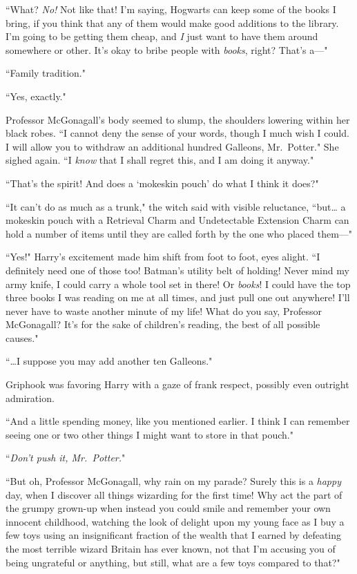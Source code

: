 ``What? \emph{No!} Not like that! I'm saying, Hogwarts can keep some of the books I bring, if you think that any of them would make good additions to the library. I'm going to be getting them cheap, and \emph{I} just want to have them around somewhere or other. It's okay to bribe people with \emph{books}, right? That's a—"

``Family tradition."

``Yes, exactly."

Professor McGonagall's body seemed to slump, the shoulders lowering within her black robes. ``I cannot deny the sense of your words, though I much wish I could. I will allow you to withdraw an additional hundred Galleons, Mr.~Potter." She sighed again. ``I \emph{know} that I shall regret this, and I am doing it anyway."

``That's the spirit! And does a `mokeskin pouch' do what I think it does?"

``It can't do as much as a trunk," the witch said with visible reluctance, ``but{\ldots} a mokeskin pouch with a Retrieval Charm and Undetectable Extension Charm can hold a number of items until they are called forth by the one who placed them---"

``Yes!" Harry's excitement made him shift from foot to foot, eyes alight. ``I definitely need one of those too! Batman's utility belt of holding! Never mind my army knife, I could carry a whole tool set in there! Or \emph{books}! I could have the top three books I was reading on me at all times, and just pull one out anywhere! I'll never have to waste another minute of my life! What do you say, Professor McGonagall? It's for the sake of children's reading, the best of all possible causes."

``{\ldots}I suppose you may add another ten Galleons."

Griphook was favoring Harry with a gaze of frank respect, possibly even outright admiration.

``And a little spending money, like you mentioned earlier. I think I can remember seeing one or two other things I might want to store in that pouch."

``\emph{Don't push it, Mr.~Potter.}"

``But oh, Professor McGonagall, why rain on my parade? Surely this is a \emph{happy} day, when I discover all things wizarding for the first time! Why act the part of the grumpy grown-up when instead you could smile and remember your own innocent childhood, watching the look of delight upon my young face as I buy a few toys using an insignificant fraction of the wealth that I earned by defeating the most terrible wizard Britain has ever known, not that I'm accusing you of being ungrateful or anything, but still, what are a few toys compared to that?"

